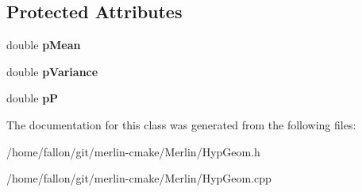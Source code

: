 \subsection*{Protected Attributes}
\begin{DoxyCompactItemize}
\item 
\mbox{\label{classHyperGeometric_aac24e6315abfbd3d5f8ca8a3bc71ecb8}} 
double {\bfseries p\+Mean}
\item 
\mbox{\label{classHyperGeometric_a2a26f69a62deab5a542c32f34cc54db1}} 
double {\bfseries p\+Variance}
\item 
\mbox{\label{classHyperGeometric_a8abe2e5f1133067e04451ddf0890696c}} 
double {\bfseries pP}
\end{DoxyCompactItemize}


The documentation for this class was generated from the following files\+:\begin{DoxyCompactItemize}
\item 
/home/fallon/git/merlin-\/cmake/\+Merlin/Hyp\+Geom.\+h\item 
/home/fallon/git/merlin-\/cmake/\+Merlin/Hyp\+Geom.\+cpp\end{DoxyCompactItemize}
